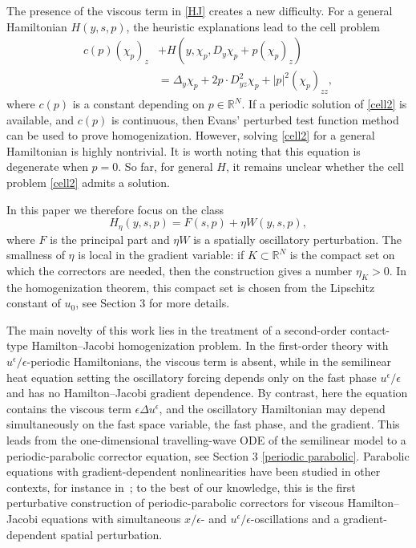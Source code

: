\documentclass[preprint]{elsarticle}
\numberwithin{equation}{section}
\begin{document}
The presence of the viscous term in \eqref{HJ} creates a new difficulty. For a general Hamiltonian $H(y,s,p)$, the heuristic explanations  lead to the cell problem
\begin{equation}
\begin{aligned}
c(p)(\chi_p)_z
&+
H\left(y,\chi_p,D_y\chi_p+p(\chi_p)_z\right)
\\
&=
\Delta_y\chi_p
+
2p\cdot D^2_{yz}\chi_p
+
|p|^2(\chi_p)_{zz},
\end{aligned}\label{cell2}
\end{equation}
where $c(p)$ is a constant depending on $p\in\mathbb R^N$. If a periodic solution of \eqref{cell2} is available, and $c(p)$ is continuous, then Evans' perturbed test function method~\cite{Evans1989} can be used to prove homogenization. However, solving \eqref{cell2} for a general Hamiltonian is highly nontrivial. It is worth noting that this equation is degenerate when $p=0$. So far, for general $H$, it remains unclear whether the cell problem  \eqref{cell2} admits a solution. 

In this paper we therefore focus on the class
\begin{equation}
H_\eta(y,s,p)=F(s,p)+\eta W(y,s,p),
\label{intro-second-H}
\end{equation}
where $F$ is the principal part and $\eta W$ is a spatially oscillatory perturbation. The smallness of $\eta$ is local in the gradient variable: if $K\subset\mathbb R^N$ is the compact set on which the correctors are needed, then the construction gives a number $\eta_K>0$. In the homogenization theorem, this compact set is chosen from the Lipschitz constant of $u_0$, see Section 3 for more details.


The main novelty of this work lies in the treatment of a second-order contact-type Hamilton--Jacobi homogenization problem. In the first-order theory with \(u^\epsilon/\epsilon\)-periodic Hamiltonians, the viscous term is absent, while in the semilinear heat equation setting the oscillatory forcing depends only on the fast phase \(u^\epsilon/\epsilon\) and has no Hamilton--Jacobi gradient dependence. By contrast, here the equation contains the viscous term \(\epsilon\Delta u^\epsilon\), and the oscillatory Hamiltonian may depend simultaneously on the fast space variable, the fast phase, and the gradient. This leads from the one-dimensional travelling-wave ODE of the semilinear model to a periodic-parabolic corrector equation, see Section 3 \eqref{periodic parabolic}. Parabolic equations with gradient-dependent nonlinearities have been studied in other contexts, for instance in~\cite{FernandezCaraGonzalezBurgosGuerreroPuel2006}; to the best of our knowledge, this is the first perturbative construction of periodic-parabolic correctors for viscous Hamilton--Jacobi equations with simultaneous $x/\epsilon$- and $u^\epsilon/\epsilon$-oscillations and a gradient-dependent spatial perturbation.
\end{document}
